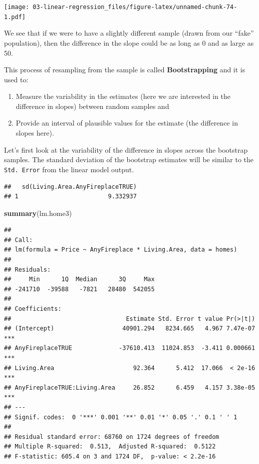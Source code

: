\documentclass[
]{book}
\newenvironment{Shaded}{\begin{snugshade}}{\end{snugshade}}
\newcommand{\CommentTok}[1]{\textcolor[rgb]{0.56,0.35,0.01}{\textit{#1}}}
\newcommand{\KeywordTok}[1]{\textcolor[rgb]{0.13,0.29,0.53}{\textbf{#1}}}
\newcommand{\NormalTok}[1]{#1}
\newcommand{\OperatorTok}[1]{\textcolor[rgb]{0.81,0.36,0.00}{\textbf{#1}}}
\newcommand{\StringTok}[1]{\textcolor[rgb]{0.31,0.60,0.02}{#1}}
\providecommand{\tightlist}{%
  \setlength{\itemsep}{0pt}\setlength{\parskip}{0pt}}
\begin{document}
\texttt{[image: 03-linear-regression\_files/figure-latex/unnamed-chunk-74-1.pdf]}

We see that if we were to have a slightly different sample (drawn from our ``fake'' population), then the difference in the slope could be as long as 0 and as large as 50.

This process of resampling from the sample is called \textbf{Bootstrapping} and it is used to:

\begin{enumerate}
\def\labelenumi{\arabic{enumi}.}
\tightlist
\item
  Measure the variability in the estimates (here we are interested in the difference in slopes) between random samples and
\item
  Provide an interval of plausible values for the estimate (the difference in slopes here).
\end{enumerate}

Let's first look at the variability of the difference in slopes across the bootstrap samples. The standard deviation of the bootstrap estimates will be similar to the \texttt{Std.\ Error} from the linear model output.

\begin{Shaded}
\end{Shaded}

\begin{verbatim}
##   sd(Living.Area.AnyFireplaceTRUE)
## 1                         9.332937
\end{verbatim}

\begin{Shaded}
\begin{Highlighting}[]
\KeywordTok{summary}\NormalTok{(lm.home3)}
\end{Highlighting}
\end{Shaded}

\begin{verbatim}
## 
## Call:
## lm(formula = Price ~ AnyFireplace * Living.Area, data = homes)
## 
## Residuals:
##     Min      1Q  Median      3Q     Max 
## -241710  -39588   -7821   28480  542055 
## 
## Coefficients:
##                                Estimate Std. Error t value Pr(>|t|)    
## (Intercept)                   40901.294   8234.665   4.967 7.47e-07 ***
## AnyFireplaceTRUE             -37610.413  11024.853  -3.411 0.000661 ***
## Living.Area                      92.364      5.412  17.066  < 2e-16 ***
## AnyFireplaceTRUE:Living.Area     26.852      6.459   4.157 3.38e-05 ***
## ---
## Signif. codes:  0 '***' 0.001 '**' 0.01 '*' 0.05 '.' 0.1 ' ' 1
## 
## Residual standard error: 68760 on 1724 degrees of freedom
## Multiple R-squared:  0.513,	Adjusted R-squared:  0.5122 
## F-statistic: 605.4 on 3 and 1724 DF,  p-value: < 2.2e-16
\end{verbatim}
\end{document}
